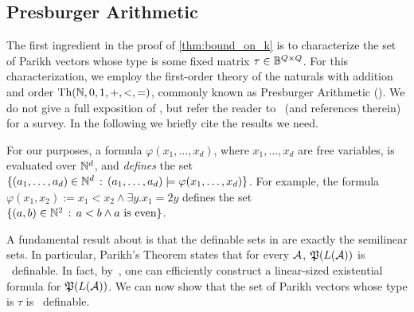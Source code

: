 \subsection*{Presburger Arithmetic}
The first ingredient in the proof of \autoref{thm:bound_on_k} is to characterize the set of Parikh vectors whose type is some fixed matrix $\tau\in \mathbb{B}^{Q\times Q}$. For this characterization, we employ the first-order theory of the naturals with addition and order $\textrm{Th}(\mathbb{N},0,1,+,<,=)$, commonly known as Presburger Arithmetic (\PA). We do not give a full exposition of \PA, but refer the reader to~\cite{Haase2018} (and references therein) for a survey. In the following we briefly cite the results we need.

For our purposes, a \PA formula $\varphi(x_1,\ldots,x_d)$, where $x_1,\ldots, x_d$ are free variables, is evaluated over $\mathbb{N}^d$, and \emph{defines} the set $\{(a_1,\ldots,a_d)\in \mathbb{N}^d\, :\, (a_1,\ldots,a_d)\models \varphi(x_1,\ldots,x_d)\}$. For example, the formula $\varphi(x_1,x_2):=x_1< x_2\wedge \exists y. x_1=2y$ defines the set $\{(a,b)\in \mathbb{N}^2\, :\, a<b\wedge a \text{ is even}\}$.

A fundamental result about \PA is that the definable sets in \PA are exactly the semilinear sets. In particular, Parikh's Theorem states that for every \NFA $\mathcal{A}$, $\mathfrak{P}(L(\mathcal{A}))$ is \PA~definable. In fact, by~\cite{Verma2005}, one can efficiently construct a linear-sized existential \PA formula for $\mathfrak{P}(L(\mathcal{A}))$.
We can now show that the set of Parikh vectors whose type is $\tau$ is \PA~definable.

